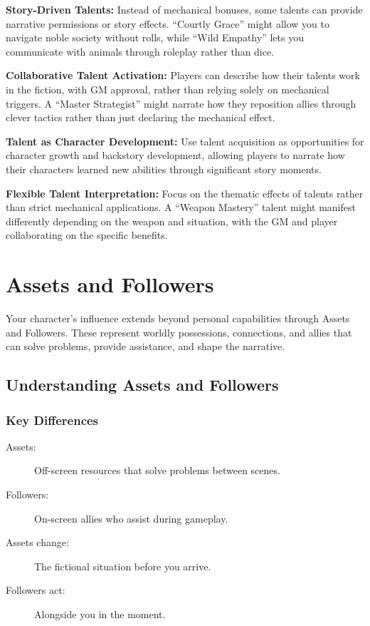 \documentclass[11pt,twoside,openany]{book}
\begin{document}
\textbf{Story-Driven Talents:} Instead of mechanical bonuses, some talents can provide narrative permissions or story effects. ``Courtly Grace'' might allow you to navigate noble society without rolls, while ``Wild Empathy'' lets you communicate with animals through roleplay rather than dice.

\textbf{Collaborative Talent Activation:} Players can describe how their talents work in the fiction, with GM approval, rather than relying solely on mechanical triggers. A ``Master Strategist'' might narrate how they reposition allies through clever tactics rather than just declaring the mechanical effect.

\textbf{Talent as Character Development:} Use talent acquisition as opportunities for character growth and backstory development, allowing players to narrate how their characters learned new abilities through significant story moments.

\textbf{Flexible Talent Interpretation:} Focus on the thematic effects of talents rather than strict mechanical applications. A ``Weapon Mastery'' talent might manifest differently depending on the weapon and situation, with the GM and player collaborating on the specific benefits.

\chapter{Assets and Followers} \label{ch:assets}

Your character's influence extends beyond personal capabilities through Assets and Followers. These represent worldly possessions, connections, and allies that can solve problems, provide assistance, and shape the narrative.

\section*{Understanding Assets and Followers} 

\subsection*{Key Differences}

\begin{description}
\item[Assets:] Off-screen resources that solve problems between scenes.
\item[Followers:] On-screen allies who assist during gameplay.
\item[Assets change:] The fictional situation before you arrive.
\item[Followers act:] Alongside you in the moment.
\end{description}
\end{document}
